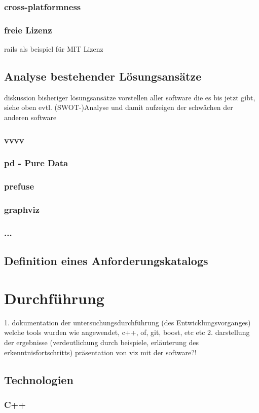 \documentclass[a4paper, 12pt, onepage, pdftex, headsepline, footsepline]{scrreprt}
\begin{document}
\subsection{cross-platformness}
\subsection{freie Lizenz}
rails als beispiel für MIT Lizenz

\section{Analyse bestehender Lösungsansätze}
diskussion bisheriger lösungsansätze
vorstellen aller software die es bis jetzt gibt, siehe oben
evtl. (SWOT-)Analyse und damit aufzeigen der schwächen der anderen software
\subsection{vvvv}
\subsection{pd - Pure Data}
\subsection{prefuse}
\subsection{graphviz}
\subsection{...}
\section{Definition eines Anforderungskatalogs}
\chapter{Durchführung}
1. dokumentation der untersuchungsdurchführung (des Entwicklungsvorganges)
welche tools wurden wie angewendet, c++, of, git, boost, etc etc
2. darstellung der ergebnisse (verdeutlichung durch beispiele, erläuterung des erkenntnisfortschritts)
präsentation von viz mit der software?!
\section{Technologien}
\subsection{C++}
\end{document}
